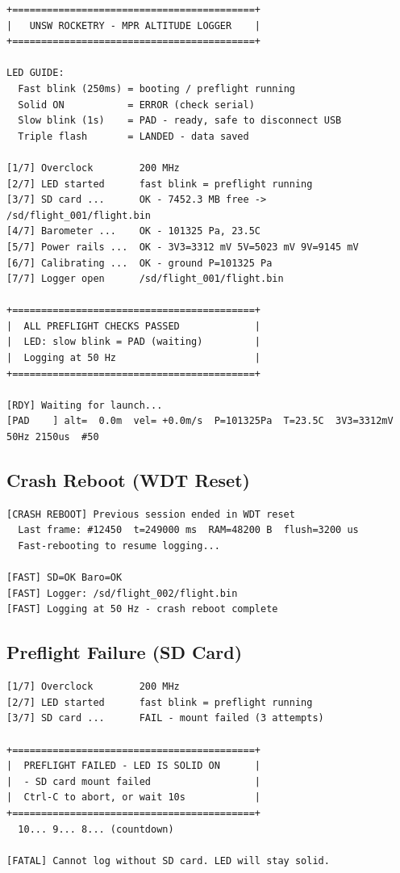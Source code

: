 \documentclass[11pt, a4paper, twoside]{article}
\begin{document}
\begin{lstlisting}[basicstyle=\ttfamily\scriptsize]
+==========================================+
|   UNSW ROCKETRY - MPR ALTITUDE LOGGER    |
+==========================================+

LED GUIDE:
  Fast blink (250ms) = booting / preflight running
  Solid ON           = ERROR (check serial)
  Slow blink (1s)    = PAD - ready, safe to disconnect USB
  Triple flash       = LANDED - data saved

[1/7] Overclock        200 MHz
[2/7] LED started      fast blink = preflight running
[3/7] SD card ...      OK - 7452.3 MB free -> /sd/flight_001/flight.bin
[4/7] Barometer ...    OK - 101325 Pa, 23.5C
[5/7] Power rails ...  OK - 3V3=3312 mV 5V=5023 mV 9V=9145 mV
[6/7] Calibrating ...  OK - ground P=101325 Pa
[7/7] Logger open      /sd/flight_001/flight.bin

+==========================================+
|  ALL PREFLIGHT CHECKS PASSED             |
|  LED: slow blink = PAD (waiting)         |
|  Logging at 50 Hz                        |
+==========================================+

[RDY] Waiting for launch...
[PAD    ] alt=  0.0m  vel= +0.0m/s  P=101325Pa  T=23.5C  3V3=3312mV  50Hz 2150us  #50
\end{lstlisting}

\subsection{Crash Reboot (WDT Reset)}

\begin{lstlisting}[basicstyle=\ttfamily\scriptsize]
[CRASH REBOOT] Previous session ended in WDT reset
  Last frame: #12450  t=249000 ms  RAM=48200 B  flush=3200 us
  Fast-rebooting to resume logging...

[FAST] SD=OK Baro=OK
[FAST] Logger: /sd/flight_002/flight.bin
[FAST] Logging at 50 Hz - crash reboot complete
\end{lstlisting}

\subsection{Preflight Failure (SD Card)}

\begin{lstlisting}[basicstyle=\ttfamily\scriptsize]
[1/7] Overclock        200 MHz
[2/7] LED started      fast blink = preflight running
[3/7] SD card ...      FAIL - mount failed (3 attempts)

+==========================================+
|  PREFLIGHT FAILED - LED IS SOLID ON      |
|  - SD card mount failed                  |
|  Ctrl-C to abort, or wait 10s            |
+==========================================+
  10... 9... 8... (countdown)

[FATAL] Cannot log without SD card. LED will stay solid.
\end{lstlisting}
\end{document}
